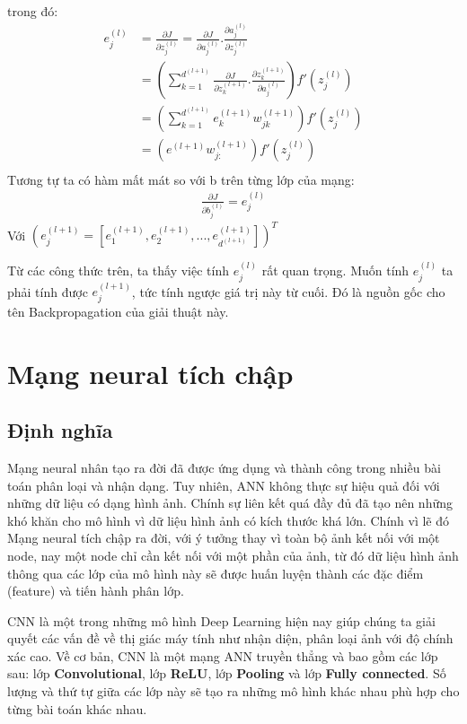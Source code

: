 trong đó:
\begin{align}
		e_j^{(l)} & = \frac{\partial J}{\partial z_j^{(l)}} = \frac{\partial J}{\partial a_j^{(l)}}.\frac{\partial a_j^{(l)}}{\partial z_j^{(l)}} \nonumber\\
		& = (\sum_{k=1}^{d^{(l+1)}} \frac{\partial J}{\partial z_k^{(l+1)}}.\frac{\partial z_k^{(l+1)}}{\partial a_j^{(l)}} )f'(z_j^{(l)}) \nonumber\\
		& = (\sum_{k=1}^{d^{(l+1)}} e_k^{(l+1)}w_{jk}^{(l+1)} )f'(z_j^{(l)}) \nonumber\\
		& = (e^{(l+1)}w_{j:}^{(l+1)})f'(z_j^{(l)}) \nonumber\\
\end{align}
Tương tự ta có hàm mất mát so với b trên từng lớp của mạng:
	\begin{align}
	\frac{\partial J}{\partial b_j^{(l)}} = e_j^{(l)}
\end{align}
Với \( (e_j^{(l+1)} = [e_1^{(l+1)}, e_2^{(l+1)},...,e_{d^{(l+1)}}^{(l+1)}])^T \)

Từ các công thức trên, ta thấy việc tính \(e_j^{(l)}\) rất quan trọng. Muốn tính \(e_j^{(l)}\) ta phải tính được \(e_j^{(l+1)}\), tức tính ngược giá trị này từ cuối. Đó là nguồn gốc cho tên Backpropagation của giải thuật này.

\section{Mạng neural tích chập}
\subsection{Định nghĩa}
Mạng neural nhân tạo ra đời đã được ứng dụng và thành công trong nhiều bài toán phân loại và nhận dạng. Tuy nhiên, ANN không thực sự hiệu quả đối với những dữ liệu có dạng hình ảnh. Chính sự liên kết quá đầy đủ đã tạo nên những khó khăn cho mô hình vì dữ liệu hình ảnh có kích thước khá lớn. Chính vì lẽ đó Mạng neural tích chập ra đời, với ý tưởng thay vì toàn bộ ảnh kết nối với một node, nay một node chỉ cần kết nối với một phần của ảnh, từ đó dữ liệu hình ảnh thông qua các lớp của mô hình này sẽ được huấn luyện thành các đặc điểm (feature) và tiến hành phân lớp.

CNN là một trong những mô hình Deep Learning hiện nay giúp chúng ta giải quyết các vấn đề về thị giác máy tính như nhận diện, phân loại ảnh với độ chính xác cao. Về cơ bản, CNN là một mạng ANN truyền thẳng và bao gồm các lớp sau: lớp \textbf{Convolutional}, lớp \textbf{ReLU}, lớp \textbf{Pooling} và lớp  \textbf{Fully connected}. Số lượng và thứ tự giữa các lớp này sẽ tạo ra những mô hình khác nhau phù hợp cho từng bài toán khác nhau.


